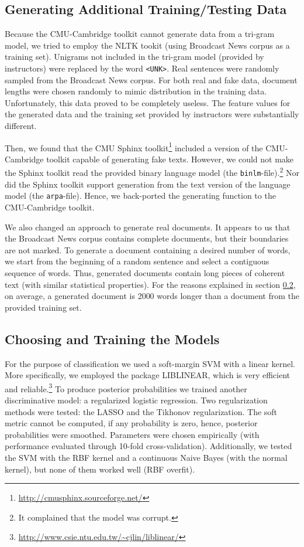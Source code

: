 \documentclass[11pt]{article}
\begin{document}
\subsection{Generating Additional Training/Testing Data}\label{SectGen}
Because the CMU-Cambridge toolkit cannot generate data from a tri-gram model,
we tried to employ the NLTK tookit (using Broadcast News corpus as a training set).
Unigrams not included in the tri-gram model (provided by instructors) were replaced by the word \texttt{<UNK>}.
Real sentences were randomly sampled from the Broadcast News corpus.
For both real and fake data, document lengths were chosen randomly to mimic distribution in the training data.
Unfortunately, this data proved to be completely useless. The feature values for the generated data
and the training set provided by instructors were substantially different.

Then, we found that the CMU Sphinx toolkit\footnote{\url{http://cmusphinx.sourceforge.net/}}
included a version of the CMU-Cambridge toolkit capable of generating fake texts.
However, we could not make the Sphinx toolkit read the provided binary language model (the \texttt{binlm}-file).\footnote{It complained that the model was corrupt.} Nor did the Sphinx toolkit
support generation from the text version of the language model (the \texttt{arpa}-file).
Hence, we back-ported the generating function to the CMU-Cambridge toolkit.

We also changed an approach to generate real documents.
It appears to us that the Broadcast News corpus contains complete documents, but their boundaries are not marked.
To generate a document containing a desired number of
words, we start from the beginning of a random sentence and select a contiguous sequence
of words. Thus, generated documents contain long pieces of coherent text (with similar statistical properties).
For the reasons explained in section \ref{SectTrain}, on average, a generated document is
2000 words longer than  a document from the provided training set.

\subsection{Choosing and Training the Models}\label{SectTrain}
For the purpose of classification we used a soft-margin SVM with a linear kernel. 
More specifically, we employed the package LIBLINEAR,
which is very efficient and reliable.\footnote{\url{http://www.csie.ntu.edu.tw/~cjlin/liblinear/}}
To produce posterior probabilities we trained another discriminative model: a
regularized logistic regression.
Two regularization methods were tested: the LASSO and the Tikhonov regularization.
The soft metric cannot be computed, if any probability is zero,
hence, posterior probabilities were smoothed.
Parameters were chosen empirically (with performance evaluated through 10-fold cross-validation).
Additionally, we tested the SVM with the RBF kernel and a continuous Naive Bayes (with the normal kernel),
but none of them worked well (RBF overfit).
\end{document}
